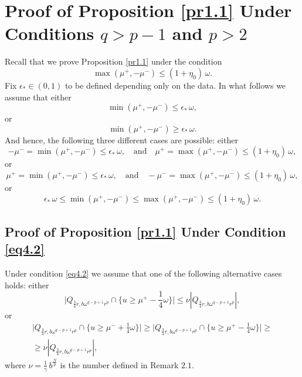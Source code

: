\documentclass[a4paper,11pt,fullpage]{article}
\numberwithin{equation}{section}
\begin{document}
\section{Proof of Proposition \ref{pr1.1} Under Conditions $q>p-1$ and $p>2$}
Recall that we prove Proposition \ref{pr1.1} under the condition
\begin{equation}\label{eq4.1}
\max(\mu^+, -\mu^-)\leqslant (1+\eta_0)\,\omega.
\end{equation} 
Fix  $\epsilon_*\in (0, 1)$ to be defined depending only on the data. In what follows we assume that  either 
$$\min(\mu^+, -\mu^-)\leqslant \epsilon_*\,\omega,$$
or
$$\min(\mu^+, -\mu^-)\geqslant \epsilon_*\,\omega.$$
And hence, the following three
different cases are possible:  either
\begin{equation}\label{eq4.2}
-\mu^-=\min(\mu^+, -\mu^-)\leqslant \epsilon_*\,\omega ,\quad \text{and}\quad \mu^+=\max(\mu^+, -\mu^-)\leqslant (1+\eta_0)\,\omega,
\end{equation}
or
\begin{equation}\label{eq4.3}
\mu^+=\min(\mu^+, -\mu^-)\leqslant \epsilon_*\, \omega,\quad \text{and}\quad -\mu^-=\max(\mu^+, -\mu^-)\leqslant (1+\eta_0)\,\omega,
\end{equation}
or
\begin{equation}\label{eq4.4}
\epsilon_*\,\omega\leqslant \min(\mu^+, -\mu^-)\leqslant \max(\mu^+, -\mu^-)\leqslant (1+\eta_0)\,\omega.
\end{equation}



\subsection{Proof of Proposition \ref{pr1.1} Under Condition \eqref{eq4.2}}

Under condition \eqref{eq4.2} we assume that one of the following alternative cases holds: either
\begin{equation}\label{eq4.5}
\big|Q_{\frac{3}{4} r, b\omega^{q-p+1} r^p}\cap\big\{u\geqslant \mu^+-\frac{1}{4}\omega\big\}\big|\leqslant \nu|Q_{\frac{3}{4}r, b\omega^{q-p+1}r^p}|,
\end{equation}
or
\begin{multline}\label{eq4.6}
\big|Q_{\frac{3}{4} r, b\omega^{q-p+1} r^p}\cap\big\{u\geqslant \mu^-+\frac{1}{4}\omega\big\}\big|\geqslant \big|Q_{\frac{3}{4} r, b\omega^{q-p+1} r^p}\cap\big\{u\geqslant \mu^+-\frac{1}{4}\omega\big\}\big|\geqslant\\\geqslant \nu|Q_{\frac{3}{4}r, b\omega^{q-p+1}r^p}|,
\end{multline}
where  $\nu=\frac{1}{\gamma}\,b^{\frac{N}{p}}$ is the number defined in Remark $2.1$.
\end{document}
